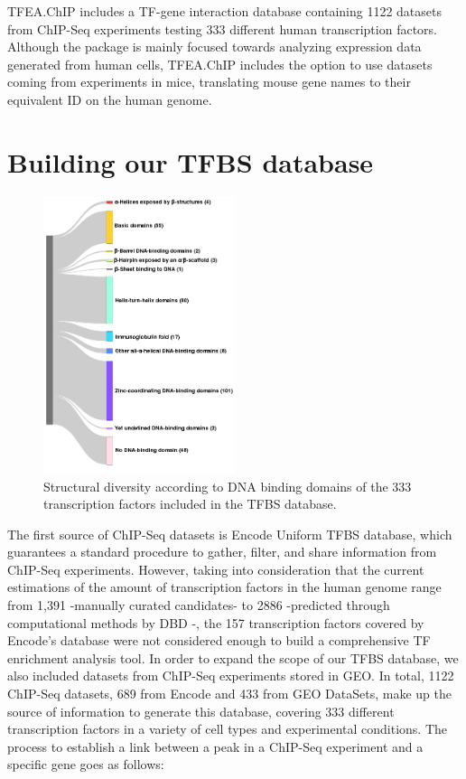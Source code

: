 \documentclass[a4paper, 12pt ]{article}
\begin{document}
TFEA.ChIP includes a TF-gene interaction database containing 1122 datasets from ChIP-Seq experiments testing 333 different human transcription factors. Although the package is mainly focused towards analyzing expression data generated from human cells, TFEA.ChIP includes the option to use datasets coming from experiments in mice, translating mouse gene names to their equivalent ID on the human genome. 

\section{Building our TFBS database}

\begin{figure}
	\centering
	\includegraphics[width=0.5\textwidth]{superclases}
	 \caption{Structural diversity according to DNA binding domains of the 333 transcription factors included in the TFBS database.}
\end{figure}

The first source of ChIP-Seq datasets is Encode Uniform TFBS database, which guarantees a standard procedure to gather, filter, and share information from ChIP-Seq experiments. However, taking into consideration that the current estimations of the amount of transcription factors in the human genome range from 1,391\cite{TFcensus} -manually curated candidates- to 2886 -predicted through computational methods by DBD\cite{DBD1}\cite{DBD2} -, the 157 transcription factors covered by Encode’s database were not considered enough to build a comprehensive TF enrichment analysis tool.
In order to expand the scope of our TFBS database, we also included datasets from ChIP-Seq experiments stored in GEO. In total, 1122 ChIP-Seq datasets, 689 from Encode and 433 from GEO DataSets, make up the source of information to generate this database, covering 333 different transcription factors in a variety of cell types and experimental conditions.
The process to establish a link between a peak in a ChIP-Seq experiment and a specific gene goes as follows:
\end{document}
